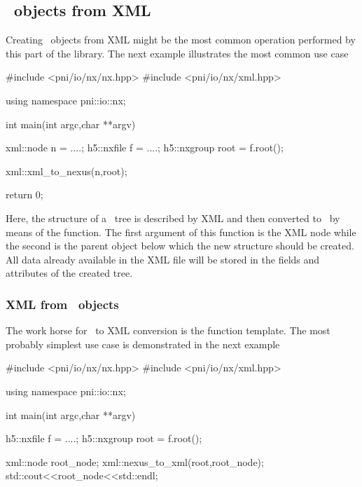 {%
\subsection{\nexus\ objects from XML}\label{sec:xml::nxtoxml}

Creating \nexus\ objects from XML might be the most common operation performed 
by this part of the library. The next example illustrates the most common 
use case 
\begin{cppcode}
#include <pni/io/nx/nx.hpp>
#include <pni/io/nx/xml.hpp>

using namespace pni::io::nx;

int main(int argc,char **argv)
{
    xml::node n = ....;
    h5::nxfile f = ....;
    h5::nxgroup root = f.root();
    
    xml::xml_to_nexus(n,root);

    return 0;
}
\end{cppcode}
Here, the structure of a \nexus\ tree is described by XML and then converted 
to \nexus\ by means of the  function. The first argument 
of this function is the XML node while the second is the parent object 
below which the new structure should be created. All data already available 
in the XML file will be stored in the fields and attributes of the created
\nexus\-tree. 


\subsubsection{XML from \nexus\ objects}\label{sec:xml:xmltonx}

The work horse for \nexus\ to XML conversion is the  function
template. The most probably simplest use case is demonstrated in the next
example 
\begin{cppcode}
#include <pni/io/nx/nx.hpp>
#include <pni/io/nx/xml.hpp>

using namespace pni::io::nx;

int main(int argc,char **argv)
{
    h5::nxfile f = ....;
    h5::nxgroup root = f.root();

    xml::node root_node;
    xml::nexus_to_xml(root,root_node);
    std::cout<<root_node<<std::endl;

}
\end{cppcode}}
